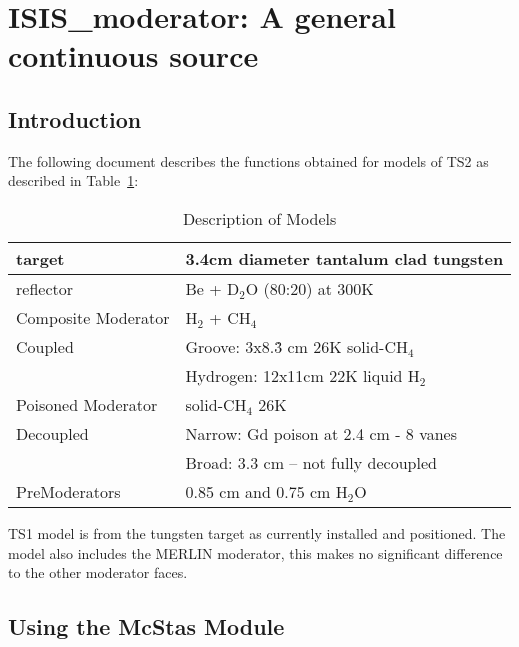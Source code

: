 \section{ISIS\_moderator: A general continuous source}
\label{isis-moderator}


\subsection{Introduction}

The following document describes the functions obtained for models of
TS2 as described in Table~\ref{desc}:

\begin{table}[h]
\begin{center}
\begin{tabular}{|l|l|}
\hline
target & 3.4cm diameter tantalum clad tungsten \\
\hline
reflector & Be + D$_2$O (80:20) at 300K \\
\hline
Composite Moderator & H$_2$ + CH$_4$ \\
Coupled         & Groove: 3x8.\.{3} cm 26K solid-CH$_4$ \\
                & Hydrogen: 12x11cm 22K liquid H$_2$ \\
\hline
Poisoned Moderator &  solid-CH$_4$ 26K  \\
Decoupled           & Narrow: Gd poison at 2.4 cm - 8 vanes\\
                    &  Broad: 3.3 cm -- not fully decoupled \\
\hline
PreModerators & 0.85 cm and 0.75 cm H$_2$O \\
\hline
\end{tabular}
\caption{Description of Models}
\label{desc}
\end{center}
\end{table}

TS1 model is from the tungsten target as currently installed and
positioned. The model also includes the MERLIN moderator, this
makes no significant difference to the other moderator faces.




\subsection{Using the McStas Module}

